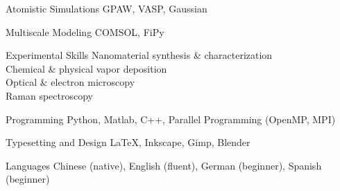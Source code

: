 

\begin{cvskills}
  \cvskill
  {Atomistic Simulations}
  {GPAW, VASP, Gaussian}

  \cvskill
  {Multiscale Modeling}
  {COMSOL, FiPy}

  \cvskill
  {Experimental Skills}
  {
    Nanomaterial synthesis \& characterization\\
    Chemical \& physical vapor deposition \\
    Optical \& electron microscopy \\
    Raman spectroscopy
  }

  \cvskill
  {Programming}
  {Python, Matlab, C++, Parallel Programming (OpenMP, MPI)}

  \cvskill
  {Typesetting and Design}
  {\LaTeX, Inkscape, Gimp, Blender}

  \cvskill
  {Languages}
  {Chinese (native), English (fluent),
    German (beginner), Spanish (beginner)}
\end{cvskills}
